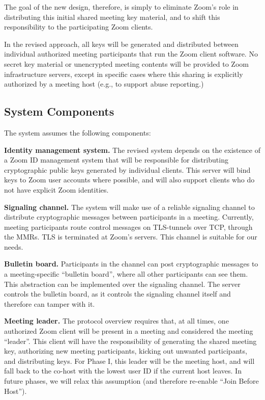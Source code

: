 The goal of the new design, therefore, is simply to eliminate Zoom's role in distributing this initial shared meeting key material, and to shift this responsibility to the participating Zoom clients.

In the revised approach, all keys will be generated and distributed between individual authorized meeting participants that run the Zoom client software. No secret key material or unencrypted meeting contents will be provided to Zoom infrastructure servers, except in specific cases where this sharing is explicitly authorized by a meeting host (e.g., to support abuse reporting.)

\subsection{System Components}
\label{subsec:comp}

The system assumes the following components:
\begin{description}
\item {\bf Identity management system.} The revised system depends on the existence of a Zoom ID management system that will be responsible for distributing cryptographic public keys generated by individual clients. This server will bind keys to Zoom user accounts where possible, and will also support clients who do not have explicit Zoom identities.

\item {\bf Signaling channel.} The system will make use of a reliable signaling channel to distribute cryptographic messages between participants in a meeting. Currently, meeting participants route control messages on TLS-tunnels over TCP, through the MMRs. TLS is terminated at Zoom's servers. This channel is suitable for our needs.

\item {\bf Bulletin board.} Participants in the channel can post cryptographic messages to a meeting-specific ``bulletin board'', where all other participants can see them. This abstraction can be implemented over the signaling channel. The server controls the bulletin board, as it controls the signaling channel itself and therefore can tamper with it.

\item {\bf Meeting leader.} The protocol overview requires that, at all times, one authorized Zoom client will be present in a meeting and considered the meeting ``leader''. This client will have the responsibility of generating the shared meeting key, authorizing new meeting participants, kicking out unwanted participants, and distributing keys. For Phase I, this leader will be the meeting host, and will fall back to the co-host with the lowest user ID if the current host leaves. In future phases, we will relax this assumption (and therefore re-enable ``Join Before Host'').

\end{description}


